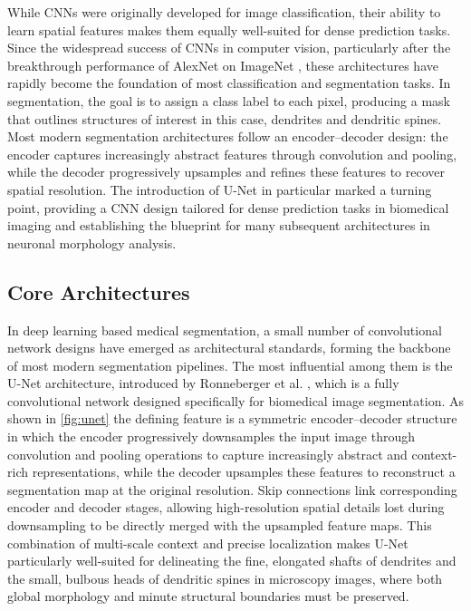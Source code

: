While \gls{CNN}s were originally developed for image classification, their ability to learn spatial features makes them equally well-suited for dense prediction tasks. Since the widespread success of \gls{CNN}s in computer vision, particularly after the breakthrough performance of AlexNet on ImageNet \cite{Krizhevsky_2012}, these architectures have rapidly become the foundation of most classification and segmentation tasks.
In segmentation, the goal is to assign a class label to each pixel, producing a mask that outlines structures of interest in this case, dendrites and dendritic spines. Most modern segmentation architectures follow an encoder–decoder design: the encoder captures increasingly abstract features through convolution and pooling, while the decoder progressively upsamples and refines these features to recover spatial resolution. The introduction of U-Net in particular marked a turning point, providing a \gls{CNN} design tailored for dense prediction tasks in biomedical imaging and establishing the blueprint for many subsequent architectures in neuronal morphology analysis.

\subsection{Core Architectures}
In deep learning based medical segmentation, a small number of convolutional network designs have emerged as architectural standards, forming the backbone of most modern segmentation pipelines. The most influential among them is the U-Net architecture, introduced by Ronneberger et al. \cite{Ronneberger_2015}, which is a fully convolutional network designed specifically for biomedical image segmentation. As shown in \autoref{fig:unet} the defining feature is a symmetric encoder–decoder structure in which the encoder progressively downsamples the input image through convolution and pooling operations to capture increasingly abstract and context-rich representations, while the decoder upsamples these features to reconstruct a segmentation map at the original resolution. Skip connections link corresponding encoder and decoder stages, allowing high-resolution spatial details lost during downsampling to be directly merged with the upsampled feature maps. This combination of multi-scale context and precise localization makes U-Net particularly well-suited for delineating the fine, elongated shafts of dendrites and the small, bulbous heads of dendritic spines in microscopy images, where both global morphology and minute structural boundaries must be preserved.

